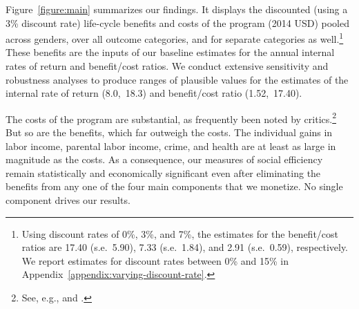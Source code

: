 \noindent Figure~\ref{figure:main} summarizes our findings. It displays the discounted (using a 3\% discount rate) life-cycle benefits and costs of the program (2014 USD) pooled across genders, over all outcome categories, and for separate categories as well.\footnote{Using discount rates of 0\%, 3\%, and 7\%, the estimates for the benefit/cost ratios are 17.40 (s.e.\ 5.90), 7.33 (s.e.\ 1.84), and 2.91 (s.e.\ 0.59), respectively. We report estimates for discount rates between 0\% and 15\% in  Appendix~\ref{appendix:varying-discount-rate}.} These benefits are the inputs of our baseline estimates for the annual internal rates of return and benefit/cost ratios. We conduct extensive sensitivity and robustness analyses to produce ranges of plausible values for the estimates of the internal rate of return (8.0,\ 18.3) and benefit/cost ratio (1.52,\ 17.40). 

The costs of the program are substantial, as frequently been noted by critics.\footnote{See, e.g., \citet{Fox_News_2014_Head_Start_Effects} and \citet{Whitehurst_2014_Senate_Testimony}.} But so are the benefits, which far outweigh the costs. The individual gains in labor income, parental labor income, crime, and health are at least as large in magnitude as the costs. As a consequence, our measures of social efficiency remain statistically and economically significant even after eliminating the benefits from any one of the four main components that we monetize. No single component drives our results.

